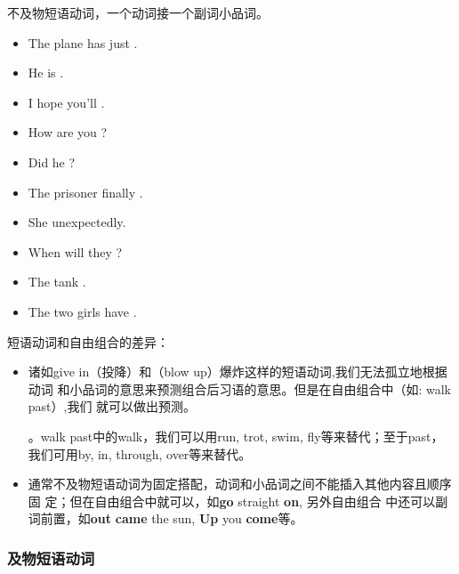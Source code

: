 不及物短语动词，一个动词接一个副词小品词。
\begin{itemize}
\item The plane has just .
\item He is .
\item I hope you'll .
\item How are you ?
\item Did he ?
\item The prisoner finally .
\item She  unexpectedly.
\item When will they ?
\item The tank .
\item The two girls have .

\end{itemize}

短语动词和自由组合的差异：
\begin{itemize}
\item 诸如give in（投降）和（blow up）爆炸这样的短语动词,我们无法孤立地根据动词
  和小品词的意思来预测组合后习语的意思。但是在自由组合中（如: walk past）,我们
  就可以做出预测。

。walk past中的walk，我们可以用run, trot, swim,
  fly等来替代；至于past，我们可用by, in, through, over等来替代。


\item 通常不及物短语动词为固定搭配，动词和小品词之间不能插入其他内容且顺序固
  定；但在自由组合中就可以，如\textbf{go} straight \textbf{on}, 另外自由组合
  中还可以副词前置，如\textbf{out} \textbf{came} the sun, \textbf{Up} you
  \textbf{come}等。

\end{itemize}

\subsubsection{及物短语动词}

